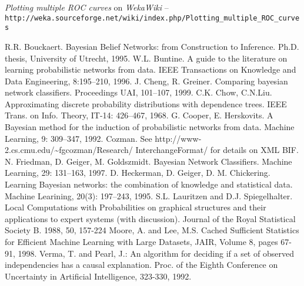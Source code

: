 \begin{thebibliography}{999}
		\textit{Plotting multiple ROC curves} on \textit{WekaWiki} -- \\
		\small{\texttt{http://weka.sourceforge.net/wiki/index.php/Plotting\_multiple\_ROC\_curves}}

		R.R. Bouckaert. Bayesian Belief Networks: from Construction to Inference. 
		Ph.D. thesis, 
		University of Utrecht, 
		1995.
		W.L. Buntine. A guide to the literature on learning probabilistic networks from data.
		IEEE Transactions on Knowledge and Data Engineering, 8:195--210, 
		1996. 
		J. Cheng, R. Greiner. 
		Comparing bayesian network classifiers. 
		Proceedings UAI,
		101--107,
		1999.
		C.K. Chow, C.N.Liu.
		Approximating discrete probability distributions with dependence trees.
		IEEE Trans. on Info. Theory, IT-14: 426--467, 1968.
		G. Cooper, E. Herskovits. 
		A Bayesian method for the induction of probabilistic networks from data. 
		Machine Learning, 9: 309--347, 1992.
		Cozman.
		See {\sf http://www-2.cs.cmu.edu/\~{}fgcozman/Research/	InterchangeFormat/}
		for details on XML BIF.
		N. Friedman, D. Geiger, M. Goldszmidt. 
		Bayesian Network Classifiers. 
		Machine Learning, 29: 131--163, 1997.
		D. Heckerman, D. Geiger, D. M. Chickering. 
		Learning Bayesian networks: the combination of knowledge and statistical data. 
		Machine Learining, 20(3): 197--243, 1995.
		S.L. Lauritzen and D.J. Spiegelhalter.
		Local Computations with Probabilities on graphical structures and their applications to expert systems (with discussion).
		Journal of the Royal Statistical Society B.
		1988, 50, 157-224
		Moore, A. and Lee, M.S. Cached Sufficient Statistics for Efficient Machine Learning with Large Datasets,
		JAIR, Volume 8, pages 67-91, 1998.
		Verma, T. and Pearl, J.:
		An algorithm for deciding if a set of observed independencies has a causal explanation.
		Proc. of the Eighth Conference on Uncertainty in Artificial Intelligence,
		323-330, 1992.


\end{thebibliography}
